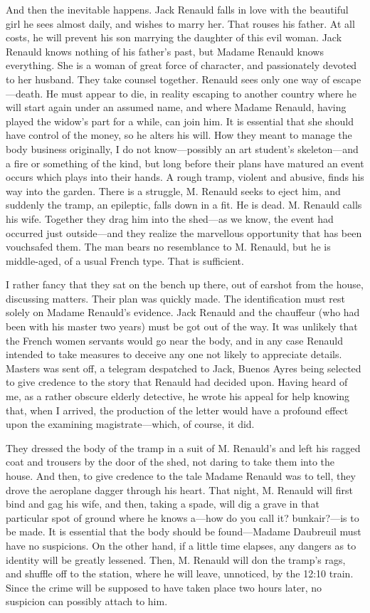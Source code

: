And then the inevitable happens. Jack Renauld falls in love with the beautiful girl he sees almost daily, and wishes to marry her. That rouses his father. At all costs, he will prevent his son marrying the daughter of this evil woman. Jack Renauld knows nothing of his father's past, but Madame Renauld knows everything. She is a woman of great force of character, and passionately devoted to her husband. They take counsel together. Renauld sees only one way of escape—death. He must appear to die, in reality escaping to another country where he will start again under an assumed name, and where Madame Renauld, having played the widow's part for a while, can join him. It is essential that she should have control of the money, so he alters his will. How they meant to manage the body business originally, I do not know—possibly an art student's skeleton—and a fire or something of the kind, but long before their plans have matured an event occurs which plays into their hands. A rough tramp, violent and abusive, finds his way into the garden. There is a struggle, M. Renauld seeks to eject him, and suddenly the tramp, an epileptic, falls down in a fit. He is dead. M. Renauld calls his wife. Together they drag him into the shed—as we know, the event had occurred just outside—and they realize the marvellous opportunity that has been vouchsafed them. The man bears no resemblance to M. Renauld, but he is middle-aged, of a usual French type. That is sufficient. 

I rather fancy that they sat on the bench up there, out of earshot from the house, discussing matters. Their plan was quickly made. The identification must rest solely on Madame Renauld's evidence. Jack Renauld and the chauffeur (who had been with his master two years) must be got out of the way. It was unlikely that the French women servants would go near the body, and in any case Renauld intended to take measures to deceive any one not likely to appreciate details. Masters was sent off, a telegram despatched to Jack, Buenos Ayres being selected to give credence to the story that Renauld had decided upon. Having heard of me, as a rather obscure elderly detective, he wrote his appeal for help knowing that, when I arrived, the production of the letter would have a profound effect upon the examining magistrate—which, of course, it did. 

They dressed the body of the tramp in a suit of M. Renauld's and left his ragged coat and trousers by the door of the shed, not daring to take them into the house. And then, to give credence to the tale Madame Renauld was to tell, they drove the aeroplane dagger through his heart. That night, M. Renauld will first bind and gag his wife, and then, taking a spade, will dig a grave in that particular spot of ground where he knows a—how do you call it? bunkair?—is to be made. It is essential that the body should be found—Madame Daubreuil must have no suspicions. On the other hand, if a little time elapses, any dangers as to identity will be greatly lessened. Then, M. Renauld will don the tramp's rags, and shuffle off to the station, where he will leave, unnoticed, by the 12:10 train. Since the crime will be supposed to have taken place two hours later, no suspicion can possibly attach to him. 

